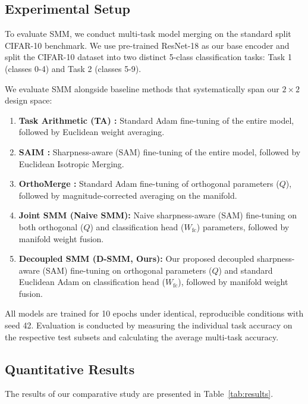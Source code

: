 \documentclass{article}
\theoremstyle{plain}
\theoremstyle{definition}
\theoremstyle{remark}
\begin{document}
\subsection{Experimental Setup}
To evaluate SMM, we conduct multi-task model merging on the standard split CIFAR-10 benchmark. We use pre-trained ResNet-18 as our base encoder and split the CIFAR-10 dataset into two distinct 5-class classification tasks: Task 1 (classes 0-4) and Task 2 (classes 5-9).

We evaluate SMM alongside baseline methods that systematically span our $2\times2$ design space:
\begin{enumerate}
    \item \textbf{Task Arithmetic (TA) \cite{ilharco23taskvectors}:} Standard Adam fine-tuning of the entire model, followed by Euclidean weight averaging.
    \item \textbf{SAIM \cite{marczak25isoc}:} Sharpness-aware (SAM) fine-tuning of the entire model, followed by Euclidean Isotropic Merging.
    \item \textbf{OrthoMerge \cite{qiu23oft}:} Standard Adam fine-tuning of orthogonal parameters ($Q$), followed by magnitude-corrected averaging on the manifold.
    \item \textbf{Joint SMM (Naive SMM):} Naive sharpness-aware (SAM) fine-tuning on both orthogonal ($Q$) and classification head ($W_{\text{fc}}$) parameters, followed by manifold weight fusion.
    \item \textbf{Decoupled SMM (D-SMM, Ours):} Our proposed decoupled sharpness-aware (SAM) fine-tuning on orthogonal parameters ($Q$) and standard Euclidean Adam on classification head ($W_{\text{fc}}$), followed by manifold weight fusion.
\end{enumerate}

All models are trained for 10 epochs under identical, reproducible conditions with seed 42. Evaluation is conducted by measuring the individual task accuracy on the respective test subsets and calculating the average multi-task accuracy.

\subsection{Quantitative Results}

The results of our comparative study are presented in Table~\ref{tab:results}.
\end{document}

